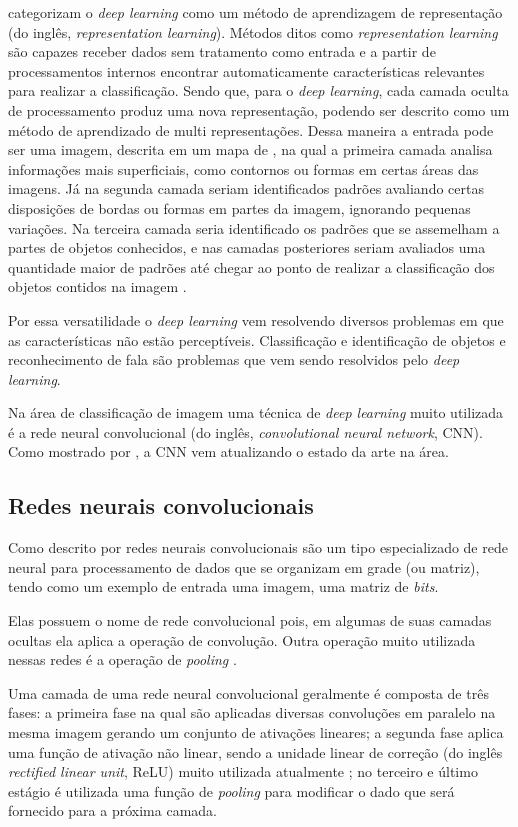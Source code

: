 \par {} categorizam o \textit{deep learning} como um método de aprendizagem de representação (do inglês, \textit{representation learning}). Métodos ditos como \textit{representation learning} são capazes receber dados sem tratamento como entrada e a partir de processamentos internos encontrar automaticamente características relevantes para realizar a classificação. Sendo que, para o \textit{deep learning}, cada camada oculta de processamento produz uma nova representação, podendo ser descrito como um método de aprendizado de multi representações. Dessa maneira a entrada pode ser uma imagem, descrita em um mapa de , na qual a primeira camada analisa informações mais superficiais, como contornos ou formas em certas áreas das imagens. Já na segunda camada seriam identificados padrões avaliando certas disposições de bordas ou formas em partes da imagem, ignorando pequenas variações. Na terceira camada seria identificado os padrões que se assemelham a partes de objetos conhecidos, e nas camadas posteriores seriam avaliados uma quantidade maior de padrões até chegar ao ponto de realizar a classificação dos objetos contidos na imagem \cite{lecun2015deep}.

\par Por essa versatilidade o \textit{deep learning} vem resolvendo diversos problemas em que as características não estão perceptíveis. Classificação e identificação de objetos \cite{farabet2013learning} e reconhecimento de fala \cite{hinton2012deep} são problemas que vem sendo resolvidos pelo \textit{deep learning}.
\par Na área de classificação de imagem uma técnica de \textit{deep learning} muito utilizada é a rede neural convolucional (do inglês, \textit{convolutional neural network}, CNN). Como mostrado por , a CNN vem atualizando o estado da arte na área.

\subsection{Redes neurais convolucionais}
Como descrito por  redes neurais convolucionais são um tipo especializado de rede neural para processamento de dados que se organizam em grade (ou matriz), tendo como um exemplo de entrada uma imagem, uma matriz de \textit{bits}.
\par Elas possuem o nome de rede convolucional pois, em algumas de suas camadas ocultas ela aplica a operação de convolução. Outra operação muito utilizada nessas redes é a operação de \textit{pooling} \cite{Goodfellow-et-al-2016}.
\par Uma camada de uma rede neural convolucional geralmente é composta de três fases: a primeira fase na qual são aplicadas diversas convoluções em paralelo na mesma imagem gerando um conjunto de ativações lineares; a segunda fase aplica uma função de ativação não linear, sendo a unidade linear de correção (do inglês \textit{rectified linear unit}, ReLU) muito utilizada atualmente \cite{lecun2015deep}; no terceiro e último estágio é utilizada uma função de \textit{pooling} para modificar o dado que será fornecido para a próxima camada.    


